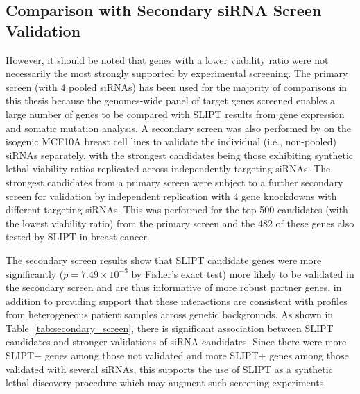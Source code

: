 \FloatBarrier

\subsection{Comparison with Secondary \gls{siRNA} Screen Validation} 
\label{chapt3:secondary_screen}

However, it should be noted that genes with a lower viability ratio were not necessarily the most strongly supported by experimental screening. The primary screen (with 4 pooled \glspl{siRNA}) has been used for the majority of comparisons in this thesis because the \glspl{genome}-wide panel of target genes screened enables a large number of genes to be compared with \gls{SLIPT} results from \gls{gene expression} and \gls{somatic} \gls{mutation} analysis. A secondary screen was also performed by \citet{Telford2015} on the isogenic \gls{MCF10A} breast cell lines to validate the individual (i.e., non-pooled) \glspl{siRNA} separately, with the strongest candidates being those exhibiting \gls{synthetic lethal} viability ratios replicated across independently targeting \glspl{siRNA}. The strongest candidates from a primary screen were subject to a further secondary screen for validation by independent replication with 4 gene knockdowns with different targeting \glspl{siRNA}. This was performed for the top 500 candidates (with the lowest viability ratio) from the primary screen and the 482 of these genes also tested by \gls{SLIPT} in breast cancer.%

The secondary screen results show that \gls{SLIPT} candidate genes were more significantly ($p=7.49 \times 10^{-3}$ by Fisher's exact test) more  likely to be validated in the secondary screen and are thus informative of more robust partner genes, in addition to providing support that these interactions are consistent with  profiles from heterogeneous patient samples across genetic backgrounds. As shown in Table~\ref{tab:secondary_screen}, there is significant %
association between \gls{SLIPT} candidates and stronger validations of \gls{siRNA} candidates. Since there were more SLIPT$-$ genes among those not validated and more SLIPT$+$ genes among those validated with several \glspl{siRNA}, this supports the use of SLIPT as a \gls{synthetic lethal} discovery procedure which may augment such screening experiments.

